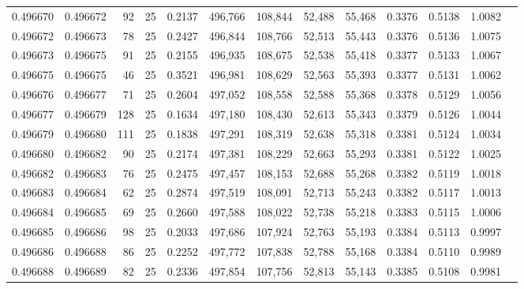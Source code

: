 \begin{tabular}{rrrrrrrrrrrrr}
0.496670 & 0.496672 &    92 &  25 &                                     0.2137 & 496,766 & 108,844 &  52,488 &  55,468 & 0.3376 & 0.5138 & 1.0082 \\
0.496672 & 0.496673 &    78 &  25 &                                     0.2427 & 496,844 & 108,766 &  52,513 &  55,443 & 0.3376 & 0.5136 & 1.0075 \\
0.496673 & 0.496675 &    91 &  25 &                                     0.2155 & 496,935 & 108,675 &  52,538 &  55,418 & 0.3377 & 0.5133 & 1.0067 \\
0.496675 & 0.496675 &    46 &  25 &                                     0.3521 & 496,981 & 108,629 &  52,563 &  55,393 & 0.3377 & 0.5131 & 1.0062 \\
0.496676 & 0.496677 &    71 &  25 &                                     0.2604 & 497,052 & 108,558 &  52,588 &  55,368 & 0.3378 & 0.5129 & 1.0056 \\
0.496677 & 0.496679 &   128 &  25 &                                     0.1634 & 497,180 & 108,430 &  52,613 &  55,343 & 0.3379 & 0.5126 & 1.0044 \\
0.496679 & 0.496680 &   111 &  25 &                                     0.1838 & 497,291 & 108,319 &  52,638 &  55,318 & 0.3381 & 0.5124 & 1.0034 \\
0.496680 & 0.496682 &    90 &  25 &                                     0.2174 & 497,381 & 108,229 &  52,663 &  55,293 & 0.3381 & 0.5122 & 1.0025 \\
0.496682 & 0.496683 &    76 &  25 &                                     0.2475 & 497,457 & 108,153 &  52,688 &  55,268 & 0.3382 & 0.5119 & 1.0018 \\
0.496683 & 0.496684 &    62 &  25 &                                     0.2874 & 497,519 & 108,091 &  52,713 &  55,243 & 0.3382 & 0.5117 & 1.0013 \\
0.496684 & 0.496685 &    69 &  25 &                                     0.2660 & 497,588 & 108,022 &  52,738 &  55,218 & 0.3383 & 0.5115 & 1.0006 \\
0.496685 & 0.496686 &    98 &  25 &                                     0.2033 & 497,686 & 107,924 &  52,763 &  55,193 & 0.3384 & 0.5113 & 0.9997 \\
0.496686 & 0.496688 &    86 &  25 &                                     0.2252 & 497,772 & 107,838 &  52,788 &  55,168 & 0.3384 & 0.5110 & 0.9989 \\
0.496688 & 0.496689 &    82 &  25 &                                     0.2336 & 497,854 & 107,756 &  52,813 &  55,143 & 0.3385 & 0.5108 & 0.9981 \\

\end{tabular}
